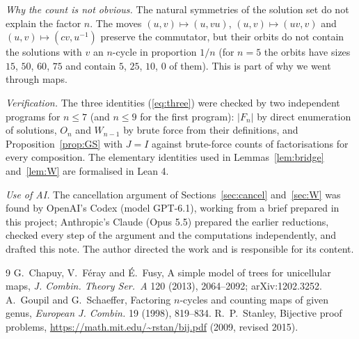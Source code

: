 \documentclass[11pt]{amsart}
\theoremstyle{remark}
\begin{document}
\emph{Why the count is not obvious.} The natural symmetries of the solution set do not explain the factor $n$. The
moves $(u,v)\mapsto(u,vu)$, $(u,v)\mapsto(uv,v)$ and $(u,v)\mapsto(cv,u^{-1})$ preserve the commutator, but their
orbits do not contain the solutions with $v$ an $n$-cycle in proportion $1/n$ (for $n=5$ the orbits have sizes $15$, $50$, $60$, $75$ and contain $5$, $25$, $10$, $0$ of them). This is
part of why we went through maps.

\emph{Verification.} The three identities (\ref{eq:three}) were checked by two independent programs for $n\le7$
(and $n\le9$ for the first program): $|F_n|$ by direct enumeration of solutions, $O_n$ and $W_{n-1}$ by brute force
from their definitions, and Proposition~\ref{prop:GS} with $J=I$ against brute-force counts of factorisations for every
composition. The elementary identities used in Lemmas~\ref{lem:bridge} and~\ref{lem:W} are formalised in Lean 4.

\emph{Use of AI.} The cancellation argument of Sections~\ref{sec:cancel} and~\ref{sec:W} was found by OpenAI's Codex (model
GPT-6.1), working from a brief prepared in this project; Anthropic's Claude (Opus 5.5) prepared the earlier reductions, checked
every step of the argument and the computations independently, and drafted this note. The author directed the work and
is responsible for its content.

\begin{thebibliography}{9}
 G.~Chapuy, V.~F\'eray and \'E.~Fusy, A simple model of trees for unicellular maps, \emph{J. Combin.
Theory Ser.~A} 120 (2013), 2064--2092; arXiv:1202.3252.
 A.~Goupil and G.~Schaeffer, Factoring $n$-cycles and counting maps of given genus, \emph{European J.
Combin.} 19 (1998), 819--834.
 R.~P.~Stanley, Bijective proof problems, \url{https://math.mit.edu/~rstan/bij.pdf} (2009, revised
2015).
\end{thebibliography}
\end{document}
